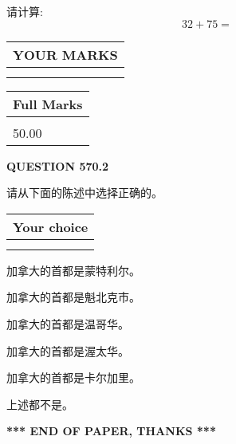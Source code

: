 \documentclass{ctexart}
\begin{document}
  
 
请计算:
\begin{equation}
32 +  %
75 = \nonumber
\end{equation}
 

 

 
  
\vspace{0.2in}
  
\noindent\begin{tabular}{|l|}
\hline
 YOUR MARKS  \\
\hline
 \\ 
 \\ 
\hline
\end{tabular}
\hspace{0.05in} \begin{tabular}{|l|}
\hline
 Full Marks  \\
\hline
 \\ 
50.00 \\
\hline
\end{tabular}
{\textbf{\Large{QUESTION
570.2 
}}}
  
  
请从下面的陈述中选择正确的。
  
  
\noindent\hspace{3.0in} \begin{tabular}{|l|}
\hline
Your choice \\
\hline
 \\ 
 \\ 
\hline
\end{tabular}
  
  
 
 
加拿大的首都是蒙特利尔。
 
 
加拿大的首都是魁北克市。
 
 
加拿大的首都是温哥华。
 
 
加拿大的首都是渥太华。
 
 
加拿大的首都是卡尔加里。
 
 
 上述都不是。
 
 
   
   
 \vspace{0.2in}
 
   
   
   
   
\vspace{1.0in} 
{\textbf{\large{ *** END OF PAPER, THANKS *** }}} 
   
\end{document}
